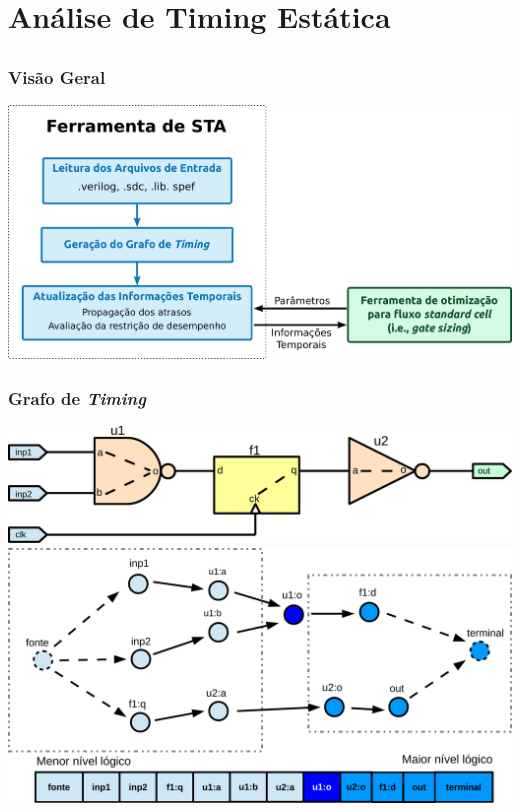 \documentclass[10pt,a4paper]{beamer}
\begin{document}
	\section{Análise de Timing Estática}
	
		\subsection*{}
		\begin{frame}
			\frametitle{Visão Geral}
			\begin{center}
				\includegraphics[width=\linewidth]{img/fluxograma_sta.pdf}
			\end{center}
		\end{frame}
		
		\begin{frame}
			\frametitle{Grafo de \textit{Timing}}
			\begin{center}
				\includegraphics[width=0.7\linewidth]{img/exemplo_circuito_simple.pdf} \\\vspace{0.5cm} \pause
				\includegraphics[width=0.8\linewidth]{img/grafo_lista_nivel_logico.pdf}
			\end{center}
		\end{frame}
		
\end{document}
